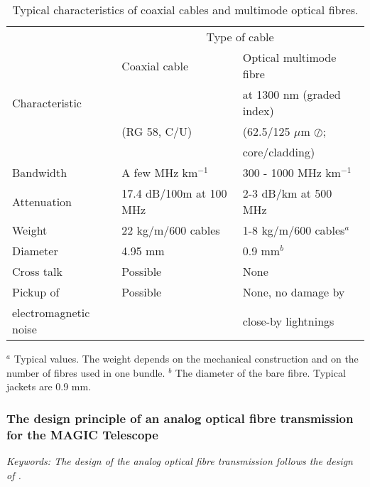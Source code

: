 \begin{table}
\begin{center}
\begin{tabular}{|l|l|l|}
\hline
& \multicolumn{2}{c|}{Type of cable} \\ 
& Coaxial cable & Optical multimode fibre \\[-0.5ex] 
Characteristic &  & at 1300 nm (graded index) \\ 
& (RG 58, C/U) & (62.5/125 $\mu $m $\oslash $; \\
               &                & core/cladding)  \\ \hline\hline
Bandwidth & A few MHz km$^{-1}$ & 300 - 1000 MHz km$^{-1}$ \\ \hline
Attenuation & 17.4 dB/100m at 100 MHz & 2-3 dB/km at 500 MHz \\ \hline
Weight & 22 kg/m/600 cables & 1-8 kg/m/600 cables$^{a}$ \\ \hline
Diameter & 4.95 mm & 0.9 mm$^{b}$ \\ \hline
Cross talk & Possible & None \\ \hline
Pickup of & Possible & None, no damage by \\[-0.5ex] 
electromagnetic noise &  & close-by lightnings \\ \hline
\end{tabular}
\caption{\label{tab-cables}
Typical characteristics of
coaxial cables and multimode optical fibres.}
\end{center}
\end{table}

\noindent
{\small $^a $ Typical values. The weight depends on the
mechanical construction and on the number of fibres used in one bundle.%
\newline
$^{b}$ The diameter of the bare fibre. Typical jackets are 0.9 mm.}

\subsubsection{The design principle of an analog optical fibre transmission
for the MAGIC Telescope}

{\it Keywords: The design of the analog optical fibre transmission follows
the design of \cite{karle:96}.}

